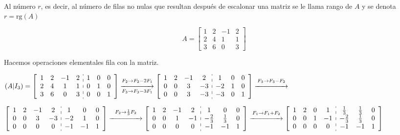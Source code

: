 Al número $r$, es decir, al número de filas no nulas que resultan después de escalonar una matriz se le llama rango de $A$ y se denota $r=\mathrm{rg}(A)$

\Ej

$$A=\begin{bmatrix}
	1 & 2 & -1 & 2 \\ 
	2 & 4 & 1 & 1 \\ 
	3 & 6 & 0 & 3
\end{bmatrix} $$

Hacemos operaciones elementales fila con la matriz.

$(A|I_3)=\left[\begin{array}{cccc:ccc}
	1 & 2 & -1 & 2 & 1 & 0 & 0 \\ 
	2 & 4 & 1 & 1 & 0 & 1 & 0 \\ 
	3 & 6 & 0 & 3 & 0 & 0 & 1
\end{array} \right]\overset{F_2\rightarrow
	F_2-2F_1}{\underset{F_3\rightarrow
		F_3-3F_1}{\xrightarrow{\hspace{1.5cm}}}}\left[\begin{array}{cccc:ccc}
	1 & 2 & -1 & 2 & 1 & 0 & 0 \\ 
	0 & 0 & 3 & -3 & -2 & 1 & 0 \\ 
	0 & 0 & 3 & -3 & -3 & 0 & 1
\end{array} \right]\overset{F_3\rightarrow
	F_3-F_2}{\xrightarrow{\hspace{1.5cm}}}$

$\left[\begin{array}{cccc:ccc}
	1 & 2 & -1 & 2 & 1 & 0 & 0 \\ 
	0 & 0 & 3 & -3 & -2 & 1 & 0 \\ 
	0 & 0 & 0 & 0 & -1 & -1 & 1
\end{array} \right]\overset{F_2\rightarrow
	\frac{1}{3}F_2}{\xrightarrow{\hspace{1.5cm}}}\left[\begin{array}{cccc:ccc}
	1 & 2 & -1 & 2 & 1 & 0 & 0 \\ 
	0 & 0 & 1 & -1 & -\textstyle\frac{2}{3} & \textstyle\frac{1}{3}
	& 0 \\
	0 & 0 & 0 & 0 & -1 & -1 & 1
\end{array} \right]\overset{F_1\rightarrow
	F_1+F_2}{\xrightarrow{\hspace{1.5cm}}}\left[\begin{array}{cccc:ccc}
	1 & 2 & 0 & 1 & \textstyle\frac{1}{3} & \textstyle\frac{1}{3} &
	0 \\
	0 & 0 & 1 & -1 & \textstyle-\frac{2}{3} & \textstyle\frac{1}{3}
	& 0 \\
	0 & 0 & 0 & 0 & -1 & -1 & 1
\end{array} \right]$


